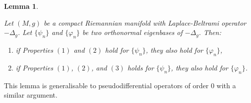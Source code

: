 \documentclass[11pt,twoside,reqno]{amsart}
\renewcommand{\phi}{\varphi}
\newcommand{\1}{\mathrm{\mathbf{1}}}
\numberwithin{equation}{section}
\theoremstyle{plain}
\newtheorem{lemma}[thm]{Lemma}
\theoremstyle{definition}
\theoremstyle{remark}
\begin{document}
\begin{lemma}\label{LE:exstension_to_other_basis}

    Let $(M,g)$ be a compact Riemannian manifold with Laplace-Beltrami operator $-\Delta_g$. Let $\{ \psi_n \}$ and $\{ \phi_n \}$ be two orthonormal eigenbases of $-\Delta_g$. Then:
    \begin{enumerate}
        \item [$(a)$] if Properties $(1)$ and $(2)$ hold for $\{ \psi_n\}$, they also hold for $\{ \phi_n \}$,
        \item [$(b)$] if Properties $(1)$, $(2)$, and $(3)$ holds for $\{ \psi_n\}$, they also hold for $\{ \phi_n \}$.
    \end{enumerate}
    
\end{lemma}
This lemma is generalisable to pseudodifferential operators of order $0$ with a similar argument.
\end{document}

